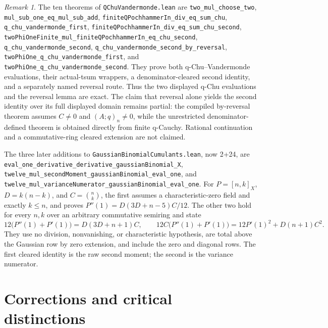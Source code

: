 \documentclass[11pt,oneside]{article}
\theoremstyle{definition}
\theoremstyle{remark}
\newtheorem{remark}[theorem]{Remark}
\begin{document}
\begin{remark}
The ten theorems of \nolinkurl{QChuVandermonde.lean} are
\nolinkurl{two_mul_choose_two}, \nolinkurl{mul_sub_one_eq_mul_sub_add},
\nolinkurl{finiteQPochhammerIn_div_eq_sum_chu},
\nolinkurl{q_chu_vandermonde_first},
\nolinkurl{finiteQPochhammerIn_div_eq_sum_chu_second},
\nolinkurl{twoPhiOneFinite_mul_finiteQPochhammerIn_eq_chu_second},
\nolinkurl{q_chu_vandermonde_second},
\nolinkurl{q_chu_vandermonde_second_by_reversal},
\nolinkurl{twoPhiOne_q_chu_vandermonde_first}, and
\nolinkurl{twoPhiOne_q_chu_vandermonde_second}.  They prove both
q-Chu--Vandermonde evaluations, their actual-tsum wrappers, a
denominator-cleared second identity, and a separately named reversal route.
Thus the two displayed q-Chu evaluations and the reversal lemma are exact.
The claim that reversal alone yields the second identity over its full
displayed domain remains partial: the compiled by-reversal theorem assumes
\(C\ne0\) and \((A;q)_n\ne0\), while the unrestricted denominator-defined
theorem is obtained directly from finite q-Cauchy.  Rational continuation and
a commutative-ring cleared extension are not claimed.

The three later additions to
\nolinkurl{GaussianBinomialCumulants.lean}, now 2+24, are
\nolinkurl{eval_one_derivative_derivative_gaussianBinomial_X},
\nolinkurl{twelve_mul_secondMoment_gaussianBinomial_eval_one}, and
\nolinkurl{twelve_mul_varianceNumerator_gaussianBinomial_eval_one}.  For
\(P=[n,k]_X\), \(D=k(n-k)\), and \(C=\binom nk\), the first assumes a
characteristic-zero field and exactly \(k\le n\), and proves
\(P''(1)=D(3D+n-5)C/12\).  The other two hold for every \(n,k\) over an
arbitrary commutative semiring and state
\[
12\bigl(P''(1)+P'(1)\bigr)=D(3D+n+1)C,
\qquad
12C\bigl(P''(1)+P'(1)\bigr)=12P'(1)^2+D(n+1)C^2.
\]
They use no division, nonvanishing, or characteristic hypothesis, are total
above the Gaussian row by zero extension, and include the zero and diagonal
rows.  The first cleared identity is the raw second moment; the second is the
variance numerator.
\end{remark}

\section{Corrections and critical distinctions}\label{app:corrections}
\end{document}
